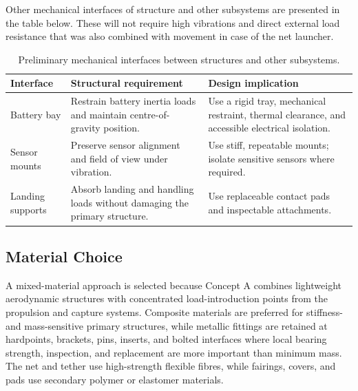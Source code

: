 Other mechanical interfaces of structure and other subsystems are presented in the table below. These will not require high vibrations and direct external load resistance that was also combined with movement in case of the net launcher. 

\begin{table}[H]
\centering
\small
\caption{Preliminary mechanical interfaces between structures and other subsystems.}
\label{tab:mechanical_interfaces_structures}
\begin{tabularx}{\textwidth}{p{} p{} X}
\toprule
\textbf{Interface} & \textbf{Structural requirement} & \textbf{Design implication} \\
\midrule

Battery bay & Restrain battery inertia loads and maintain centre-of-gravity position. & Use a rigid tray, mechanical restraint, thermal clearance, and accessible electrical isolation. \\

Sensor mounts & Preserve sensor alignment and field of view under vibration. & Use stiff, repeatable mounts; isolate sensitive sensors where required. \\

Landing supports & Absorb landing and handling loads without damaging the primary structure. & Use replaceable contact pads and inspectable attachments. \\
\bottomrule
\end{tabularx}
\end{table}



\subsection{Material Choice}

A mixed-material approach is selected because Concept A combines lightweight aerodynamic structures with concentrated load-introduction points from the propulsion and capture systems. Composite materials are preferred for stiffness- and mass-sensitive primary structures, while metallic fittings are retained at hardpoints, brackets, pins, inserts, and bolted interfaces where local bearing strength, inspection, and replacement are more important than minimum mass. The net and tether use high-strength flexible fibres, while fairings, covers, and pads use secondary polymer or elastomer materials. \\

